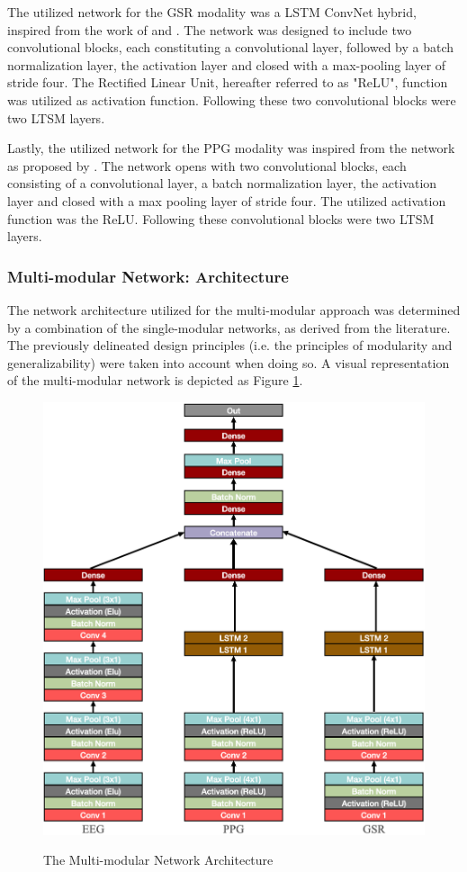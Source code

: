 \documentclass[12pt]{article}
\begin{document}
The utilized network for the GSR modality was a LSTM ConvNet hybrid, inspired from the work of  and . The network was designed to include two convolutional blocks, each constituting a convolutional layer, followed by a batch normalization layer, the activation layer and closed with a max-pooling layer of stride four. The Rectified Linear Unit, hereafter referred to as "ReLU", function was utilized as activation function. Following these two convolutional blocks were two LTSM layers.

Lastly, the utilized network for the PPG modality was inspired from the network as proposed by . The network opens with two convolutional blocks, each consisting of a convolutional layer, a batch normalization layer, the activation layer and closed with a max pooling layer of stride four. The utilized activation function was the ReLU. Following these convolutional blocks were two LTSM layers.

\subsubsection{Multi-modular Network: Architecture}
The network architecture utilized for the multi-modular approach was determined by a combination of the single-modular networks, as derived from the literature. The previously delineated design principles (i.e. the principles of modularity and generalizability) were taken into account when doing so. A visual representation of the multi-modular network is depicted as Figure \ref{fig:multiarchitecture}.

\begin{figure}
\caption{The Multi-modular Network Architecture}
\bigskip
\includegraphics[scale=0.725]{multi_model_architecture}
\label{fig:multiarchitecture}
\end{figure}
\end{document}

